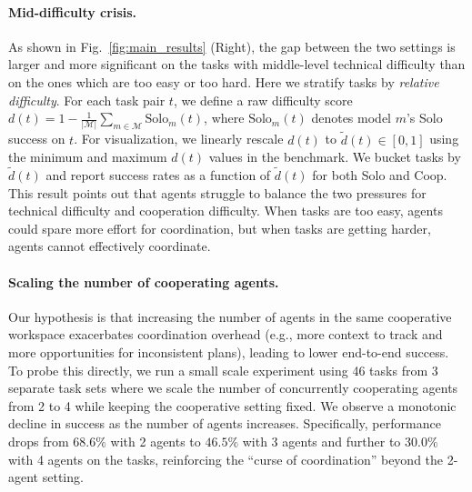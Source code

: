 \paragraph{Mid-difficulty crisis.}
As shown in Fig.~\ref{fig:main_results} (Right), the gap between the two settings is larger and more significant on the tasks with middle-level technical difficulty than on the ones which are too easy or too hard. 
Here we stratify tasks by \textit{relative difficulty}.
For each task pair \(t\), we define a raw difficulty score
\(d(t) = 1 - \frac{1}{|\mathcal{M}|}\sum_{m \in \mathcal{M}} \mathrm{Solo}_m(t)\), where \(\mathrm{Solo}_m(t)\) denotes model \(m\)'s Solo success on \(t\).
For visualization, we linearly rescale \(d(t)\) to \(\tilde d(t) \in [0,1]\) using the minimum and maximum \(d(t)\) values in the benchmark.
We bucket tasks by \(\tilde d(t)\) and report success rates as a function of \(\tilde d(t)\) for both Solo and Coop.
This result points out that agents struggle to balance the two pressures for technical difficulty and cooperation difficulty. 
When tasks are too easy, agents could spare more effort for coordination, but when tasks are getting harder, agents cannot effectively coordinate.


\paragraph{Scaling the number of cooperating agents.}
Our hypothesis is that increasing the number of agents in the same cooperative workspace exacerbates coordination overhead (e.g., more context to track and more opportunities for inconsistent plans), leading to lower end-to-end success.
To probe this directly, we run a small scale experiment using 46 tasks from 3 separate task sets where we scale the number of concurrently cooperating agents from 2 to 4 while keeping the cooperative setting fixed.
We observe a monotonic decline in success as the number of agents increases. Specifically, performance drops from \(68.6\%\) with 2 agents to \(46.5\%\) with 3 agents and further to \(30.0\%\) with 4 agents on the tasks, reinforcing the ``curse of coordination'' beyond the 2-agent setting.






